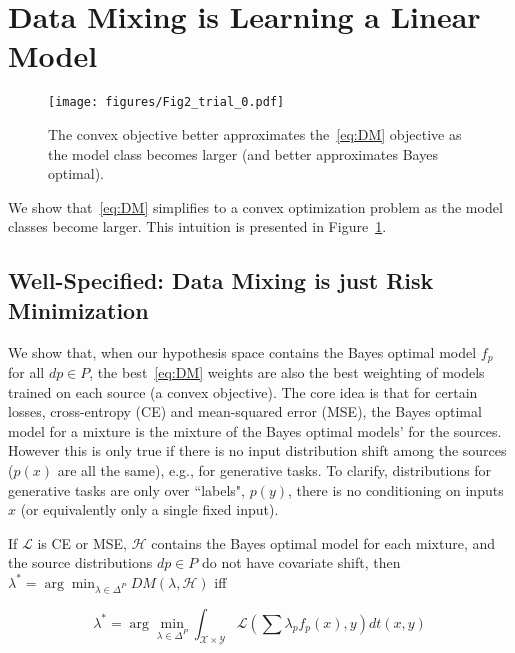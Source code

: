 \section{Data Mixing is Learning a Linear Model}

\begin{figure}[t]
\centering
    \texttt{[image: figures/Fig2\_trial\_0.pdf]}
\caption{The convex \method objective better approximates the~\ref{eq:DM} objective as the model class becomes larger (and better approximates Bayes optimal). }
\label{fig:mixmin_intuition}
\end{figure}


We show that~\ref{eq:DM} simplifies to a convex optimization problem as the model classes become larger. This intuition is presented in Figure~\ref{fig:mixmin_intuition}.





\subsection{Well-Specified: Data Mixing is just Risk Minimization}


We show that, when our hypothesis space contains the Bayes optimal model $f_p$ for all $dp \in P$, the best~\ref{eq:DM} weights are also the best weighting of models trained on each source (a convex objective). The core idea is that for certain losses, cross-entropy (CE) and mean-squared error (MSE), the Bayes optimal model for a mixture is the mixture of the Bayes optimal models' for the sources. However this is only true if there is no input distribution shift among the sources ($p(x)$ are all the same), e.g., for generative tasks. To clarify, distributions for generative tasks are only over ``labels", $p(y)$, there is no conditioning on inputs $x$ (or equivalently only a single fixed input).








\begin{theorem}
\label{thm:mixmin_reduc}
    If $\mathcal{L}$ is CE or MSE, $\mathcal{H}$ contains the Bayes optimal model for each mixture, and the source distributions $dp \in P$ do not have covariate shift, then $\lambda^* = \arg \min_{\lambda \in \Delta^P} DM(\lambda, \mathcal{H})$ iff

    \begin{equation}
\label{eq:MixMin}
    \lambda^* =  \arg\min_{\lambda \in \Delta^{P}} \int_{\mathcal{X} \times \mathcal{Y}} \mathcal{L}\left(\sum \lambda_p f_p(x),y\right) dt(x,y)
\end{equation}
\end{theorem}






